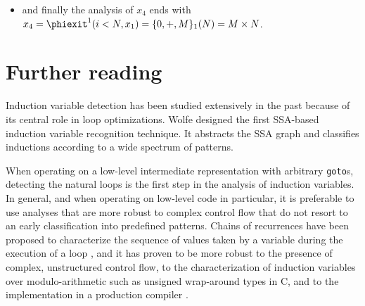 {\begin{itemize}
\begin{itemize}
\begin{itemize}
    \item the analysis of $x_0$ leads to $x_0 = 0$
    \item analyzing $x_2$ triggers the analysis of $j$, $M$, and $x_3$
      \begin{itemize}
      \item $j = \CHREC{0, +, 1}_2$ i.e., the canonical loop counter $l_2$ of $\textit{loop}_2$.
      \item $M$ is a parameter
      \item $x_3 = \phientry^2 (x_1, x_3 + 1) = \CHREC{x_1, +, 1}_2$
      \end{itemize}
    \item $x_2 = \phientry^2 (j < M, x_3)$ is then computed as the last value of $x_3$ after
      $\textit{loop}_2$, i.e., it is the chain of recurrence of $x_3$ applied
      to the first iteration of $\textit{loop}_2$ that does not satisfy $j < M$ or equivalently $l_2<M$. The corresponding Diophantine inequality $l_2\geq M$  have minimum solution $l_2=M$. So, to finish the computation of the scalar evolution of
      $x_2$ we apply $M$ to the scalar evolution of $x_3$, leading
      to $x_2 = \CHREC{x_1, +, 1}_2 (M) = x_1 + M$;
    \end{itemize}
  \item the scalar evolution analysis of $x_1$ then leads to $x_1 = \phientry^1 (x_0, x_2) = \phientry^1 (x_0, x_1 + M) = \CHREC{x_0, +, M}_1 = \CHREC{0, +, M}_1$
  \end{itemize}
\item and finally the analysis of $x_4$ ends with $x_4 = \phiexit^1 (i< N, x_1) = \CHREC{0, +, M}_1 (N) = M \times N$.
\end{itemize}


\section{Further reading}

Induction variable detection has been studied extensively in the past because of its central role in loop optimizations. 
Wolfe \cite{Wol92} designed the first SSA-based induction variable recognition technique. 
It abstracts the SSA graph and classifies inductions according to a wide spectrum of patterns.

When operating on a low-level intermediate representation with arbitrary \texttt{goto}s, detecting the natural loops is the first step in the analysis of induction variables. 
In general, and when operating on low-level code in particular, it is preferable to use analyses that are more robust to complex control flow that do not resort to an early classification into predefined patterns. 
Chains of recurrences \cite{BWZ94,KMZ98,Zim01} have been proposed to characterize the sequence of values taken by a variable during the execution of a loop \cite{vEn01}, and it has proven to be more robust to the presence of complex, unstructured control flow, to the characterization of induction variables over modulo-arithmetic such as unsigned wrap-around types in C, and to the implementation in a production compiler \cite{Pop05}.

}
